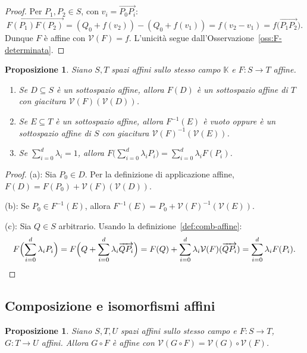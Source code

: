 \documentclass[11pt, a4paper]{book}
\theoremstyle{definition}
\theoremstyle{plain}
\newtheorem{proposizione}[definizione]{Proposizione}
\theoremstyle{remark}
\newcommand{\K}{\mathbb{K}}
\newcommand{\VV}{\mathcal{V}}   %
\begin{document}
\begin{proof}
Per $P_1, P_2 \in S$, con $v_i = \overrightarrow{P_0P_i}$:
\[
  \overrightarrow{F(P_1)F(P_2)} = (Q_0 + f(v_2)) - (Q_0 + f(v_1)) = f(v_2 - v_1) = f\bigl(\overrightarrow{P_1P_2}\bigr).
\]
Dunque $F$ è affine con $\VV(F) = f$. L'unicità segue dall'Osservazione~\ref{oss:F-determinata}.
\end{proof}

\begin{proposizione}
\label{prop:immagini-affini}
Siano $S, T$ spazi affini sullo stesso campo $\K$ e $F \colon S \to T$ affine.
\begin{enumerate}[label=(\alph*)]
  \item Se $D \subseteq S$ è un sottospazio affine, allora $F(D)$ è un sottospazio affine di $T$ con giacitura $\VV(F)(\VV(D))$.
  \item Se $E \subseteq T$ è un sottospazio affine, allora $F^{-1}(E)$ è vuoto oppure è un sottospazio affine di $S$ con giacitura $\VV(F)^{-1}(\VV(E))$.
  \item Se $\sum_{i=0}^d \lambda_i = 1$, allora $F\bigl(\sum_{i=0}^d \lambda_i P_i\bigr) = \sum_{i=0}^d \lambda_i F(P_i)$.
\end{enumerate}
\end{proposizione}

\begin{proof}
(a): Sia $P_0 \in D$. Per la definizione di applicazione affine, $F(D) = F(P_0) + \VV(F)(\VV(D))$.

(b): Se $P_0 \in F^{-1}(E)$, allora $F^{-1}(E) = P_0 + \VV(F)^{-1}(\VV(E))$.

(c): Sia $Q \in S$ arbitrario. Usando la definizione~\ref{def:comb-affine}:
\[
  F\Bigl(\sum_{i=0}^d \lambda_i P_i\Bigr) = F\Bigl(Q + \sum_{i=0}^d \lambda_i \overrightarrow{QP_i}\Bigr) = F(Q) + \sum_{i=0}^d \lambda_i \VV(F)(\overrightarrow{QP_i}) = \sum_{i=0}^d \lambda_i F(P_i). \qedhere
\]
\end{proof}

\subsection{Composizione e isomorfismi affini}

\begin{proposizione}
Siano $S, T, U$ spazi affini sullo stesso campo e $F \colon S \to T$, $G \colon T \to U$ affini. Allora $G \circ F$ è affine con $\VV(G \circ F) = \VV(G) \circ \VV(F)$.
\end{proposizione}
\end{document}

